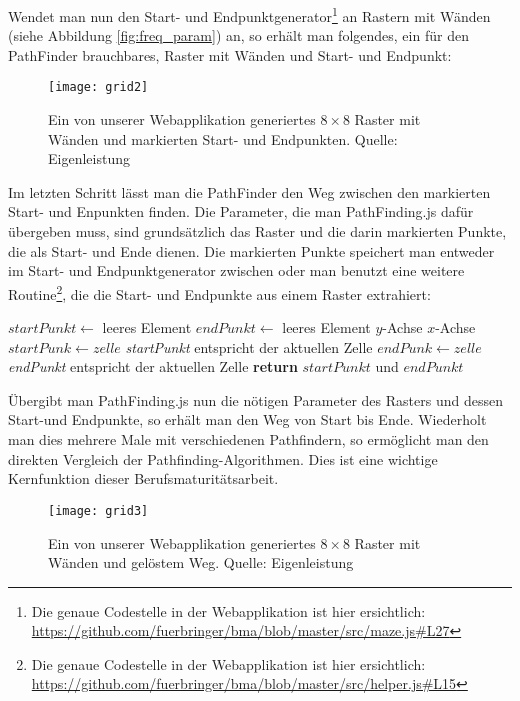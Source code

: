 Wendet man nun den Start- und Endpunktgenerator\footnote{Die genaue Codestelle in der Webapplikation ist hier ersichtlich: \url{https://github.com/fuerbringer/bma/blob/master/src/maze.js\#L27}} an Rastern mit Wänden (siehe Abbildung \ref{fig:freq_param}) an, so erhält man folgendes, ein für den PathFinder brauchbares, Raster mit Wänden und Start- und Endpunkt:
\begin{figure}[H]
  \centering
  \texttt{[image: grid2]}
  \caption[Ein von unserer Webapplikation generiertes $8\times8$ Raster mit Wänden und markierten Start- und Endpunkten.]{Ein von unserer Webapplikation generiertes $8\times8$ Raster mit Wänden und markierten Start- und Endpunkten. Quelle: Eigenleistung}
  \label{fig:grid2}
\end{figure}
Im letzten Schritt lässt man die PathFinder den Weg zwischen den markierten Start- und Enpunkten finden. Die Parameter, die man PathFinding.js dafür übergeben muss, sind grundsätzlich das Raster und die darin markierten Punkte, die als Start- und Ende dienen. Die markierten Punkte speichert man entweder im Start- und Endpunktgenerator zwischen oder man benutzt eine weitere Routine\footnote{Die genaue Codestelle in der Webapplikation ist hier ersichtlich: \url{https://github.com/fuerbringer/bma/blob/master/src/helper.js\#L15}}, die die Start- und Endpunkte aus einem Raster extrahiert:
\begin{algorithmic}[1]
  \State $startPunkt \gets$ leeres Element
  \State $endPunkt \gets$ leeres Element
   \Comment $y$-Achse
     \Comment $x$-Achse
      \State $startPunk \gets zelle$ \Comment \textit{startPunkt} entspricht der aktuellen Zelle
      \State $endPunk \gets zelle$ \Comment \textit{endPunkt} entspricht der aktuellen Zelle
    \EndIf
    \EndFor
  \EndFor
  \State \textbf{return} $startPunkt$ und $endPunkt$
  \EndProcedure
\end{algorithmic}
Übergibt man PathFinding.js nun die nötigen Parameter des Rasters und dessen Start-und Endpunkte, so erhält man den Weg von Start bis Ende. Wiederholt man dies mehrere Male mit verschiedenen Pathfindern, so ermöglicht man den direkten Vergleich der Pathfinding-Algorithmen. Dies ist eine wichtige Kernfunktion dieser Berufsmaturitätsarbeit.
\begin{figure}[H]
  \centering
  \texttt{[image: grid3]}
  \caption[Ein von unserer Webapplikation generiertes $8\times8$ Raster mit Wänden und gelöstem Weg.]{Ein von unserer Webapplikation generiertes $8\times8$ Raster mit Wänden und gelöstem Weg. Quelle: Eigenleistung}
  \label{fig:grid3}
\end{figure}
